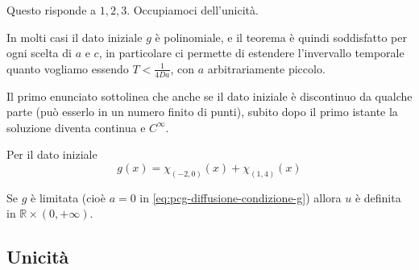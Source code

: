 \documentclass[10pt,a4paper,twoside,openright]{book}
\begin{document}
Questo risponde a $1,2,3$. Occupiamoci dell'unicità.
\begin{oss}
In molti casi il dato iniziale $g$ è polinomiale, e il teorema è quindi soddisfatto per ogni scelta di $a$ e $c$, in particolare ci permette di estendere l'invervallo temporale quanto vogliamo essendo $T< \frac{1}{4Da}$, con $a$ arbitrariamente piccolo.
\end{oss}
\begin{oss}
 Il primo enunciato sottolinea che anche se il dato iniziale è discontinuo da qualche parte (può esserlo in un numero finito di punti), subito dopo il primo istante la soluzione diventa continua e $C^{\infty }$.
\end{oss}
Per il dato iniziale
\begin{equation*}
g(x) =\chi _{(-2,0)}(x) +\chi _{(1,4)}(x)
\end{equation*}


\begin{oss}
Se $g$ è limitata (cioè $a=0$ in \eqref{eq:pcg-diffusione-condizione-g}) allora $u$ è definita in $\mathbb{R} \times (0,+\infty)$.
\end{oss}
\subsection{Unicità}
\end{document}

